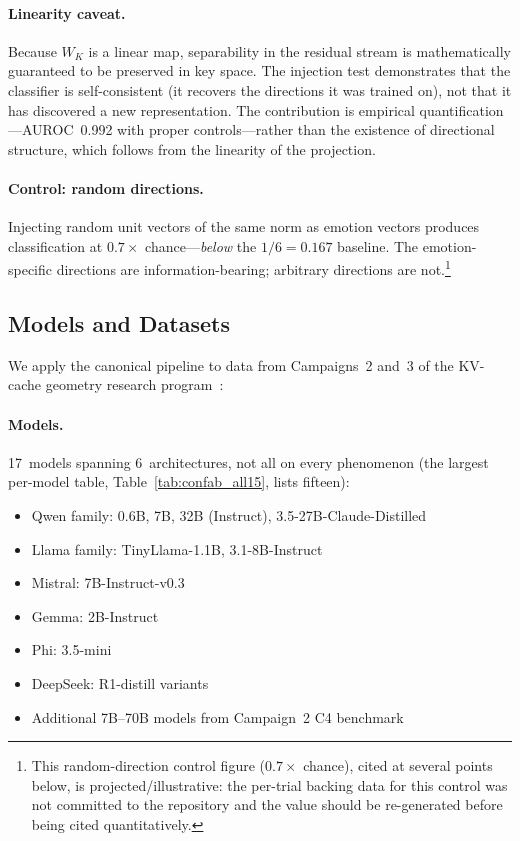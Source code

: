 \documentclass[11pt,a4paper]{article}
\begin{document}
\paragraph{Linearity caveat.} Because $W_K$ is a linear map, separability
in the residual stream is mathematically guaranteed to be preserved in key
space. The injection test demonstrates that the classifier is self-consistent
(it recovers the directions it was trained on), not that it has discovered
a new representation. The contribution is empirical quantification---AUROC~0.992
with proper controls---rather than the existence of directional structure,
which follows from the linearity of the projection.

\paragraph{Control: random directions.} Injecting random unit vectors of the
same norm as emotion vectors produces classification at $0.7\times$
chance---\emph{below} the $1/6 = 0.167$ baseline. The emotion-specific
directions are information-bearing; arbitrary directions are not.\footnote{This random-direction control figure ($0.7\times$ chance), cited at several points below, is projected/illustrative: the per-trial backing data for this control was not committed to the repository and the value should be re-generated before being cited quantitatively.}

\subsection{Models and Datasets}
\label{sec:datasets}

We apply the canonical pipeline to data from Campaigns~2 and~3 of the
KV-cache geometry research program~\citep{lyra_p2,lyra_spectral,lyra_delta}:

\paragraph{Models.} 17~models spanning 6~architectures, not all on every
phenomenon (the largest per-model table, Table~\ref{tab:confab_all15}, lists
fifteen):
\begin{itemize}[nosep]
    \item Qwen family: 0.6B, 7B, 32B (Instruct), 3.5-27B-Claude-Distilled
    \item Llama family: TinyLlama-1.1B, 3.1-8B-Instruct
    \item Mistral: 7B-Instruct-v0.3
    \item Gemma: 2B-Instruct
    \item Phi: 3.5-mini
    \item DeepSeek: R1-distill variants
    \item Additional 7B--70B models from Campaign~2 C4 benchmark
\end{itemize}
\end{document}
